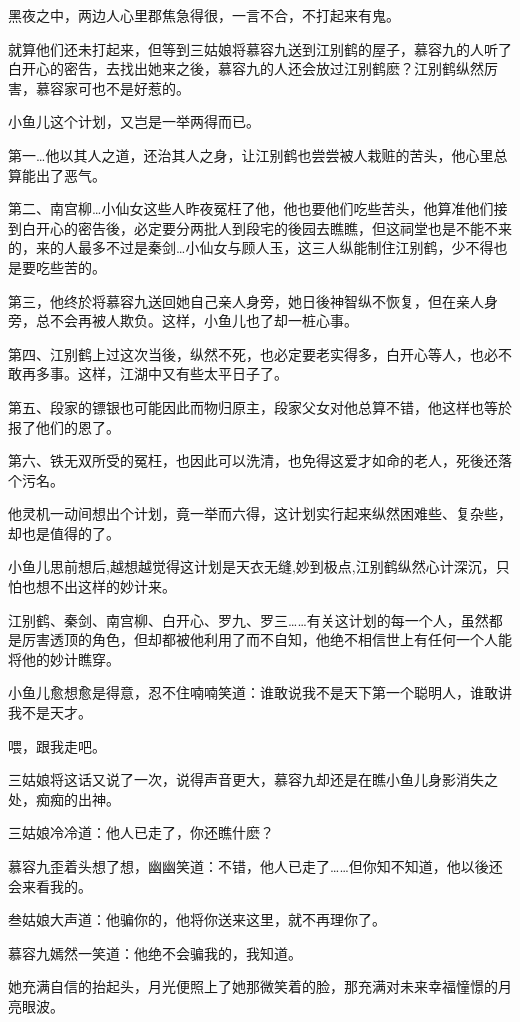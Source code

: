 \documentclass[12pt,oneside]{book}
\begin{document}
黑夜之中，两边人心里郡焦急得很，一言不合，不打起来有鬼。

就算他们还未打起来，但等到三姑娘将慕容九送到江别鹤的屋子，慕容九的人听了白开心的密告，去找出她来之後，慕容九的人还会放过江别鹤麽？江别鹤纵然厉害，慕容家可也不是好惹的。

小鱼儿这个计划，又岂是一举两得而已。

第一\ldots 他以其人之道，还治其人之身，让江别鹤也尝尝被人栽赃的苦头，他心里总算能出了恶气。

第二、南宫柳\ldots 小仙女这些人昨夜冤枉了他，他也要他们吃些苦头，他算准他们接到白开心的密告後，必定要分两批人到段宅的後园去瞧瞧，但这祠堂也是不能不来的，来的人最多不过是秦剑\ldots 小仙女与顾人玉，这三人纵能制住江别鹤，少不得也是要吃些苦的。

第三，他终於将慕容九送回她自己亲人身旁，她日後神智纵不恢复，但在亲人身旁，总不会再被人欺负。这样，小鱼儿也了却一桩心事。

第四、江别鹤上过这次当後，纵然不死，也必定要老实得多，白开心等人，也必不敢再多事。这样，江湖中又有些太平日子了。

第五、段家的镖银也可能因此而物归原主，段家父女对他总算不错，他这样也等於报了他们的恩了。

第六、铁无双所受的冤枉，也因此可以洗清，也免得这爱才如命的老人，死後还落个污名。

他灵机一动间想出个计划，竟一举而六得，这计划实行起来纵然困难些、复杂些，却也是值得的了。

小鱼儿思前想后,越想越觉得这计划是天衣无缝,妙到极点,江别鹤纵然心计深沉，只怕也想不出这样的妙计来。

江别鹤、秦剑、南宫柳、白开心、罗九、罗三\ldots\ldots 有关这计划的每一个人，虽然都是厉害透顶的角色，但却都被他利用了而不自知，他绝不相信世上有任何一个人能将他的妙计瞧穿。

小鱼儿愈想愈是得意，忍不住喃喃笑道：谁敢说我不是天下第一个聪明人，谁敢讲我不是天才。

喂，跟我走吧。

三姑娘将这话又说了一次，说得声音更大，慕容九却还是在瞧小鱼儿身影消失之处，痴痴的出神。

三姑娘冷冷道：他人已走了，你还瞧什麽？

慕容九歪着头想了想，幽幽笑道：不错，他人已走了\ldots\ldots 但你知不知道，他以後还会来看我的。

叁姑娘大声道：他骗你的，他将你送来这里，就不再理你了。

慕容九嫣然一笑道：他绝不会骗我的，我知道。

她充满自信的抬起头，月光便照上了她那微笑着的脸，那充满对未来幸福憧憬的月亮眼波。
\end{document}

